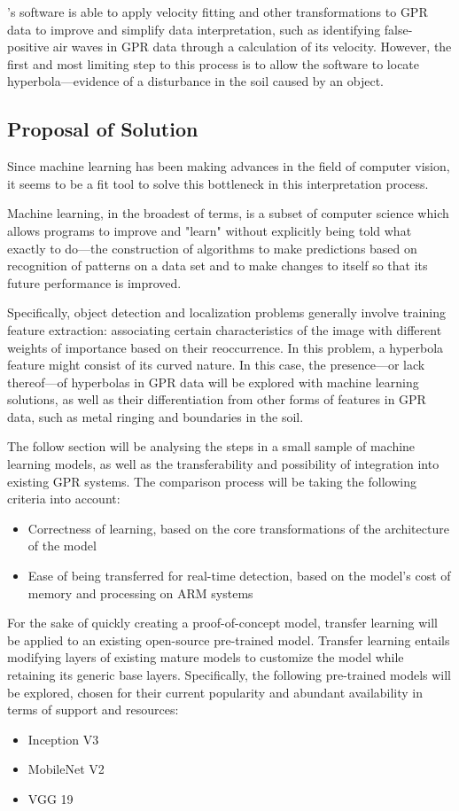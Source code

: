 \documentclass[se,blockletter]{uw-wkrpt}
\begin{document}
\thecompany{}'s software is able to apply velocity fitting and other transformations to GPR data to improve and simplify data interpretation, such as identifying false-positive air waves in GPR data through a calculation of its velocity. However, the first and most limiting step to this process is to allow the software to locate hyperbola---evidence of a disturbance in the soil caused by an object. 

\subsection{Proposal of Solution}
Since machine learning has been making advances in the field of computer vision, it seems to be a fit tool to solve this bottleneck in this interpretation process.

Machine learning, in the broadest of terms, is a subset of computer science which allows programs to improve and "learn" without explicitly being told what exactly to do---the construction of algorithms to make predictions based on recognition of patterns on a data set and to make changes to itself so that its future performance is improved. 

Specifically, object detection and localization problems generally involve training feature extraction: associating certain characteristics of the image with different weights of importance based on their reoccurrence. In this problem, a hyperbola feature might consist of its curved nature. In this case, the presence---or lack thereof---of hyperbolas in GPR data will be explored with machine learning solutions, as well as their differentiation from other forms of features in GPR data, such as metal ringing and boundaries in the soil.

The follow section will be analysing the steps in a small sample of machine learning models, as well as the transferability and possibility of integration into existing GPR systems. The comparison process will be taking the following criteria into account:
\begin{itemize}
\item Correctness of learning, based on the core transformations of the architecture of the model
\item Ease of being transferred for real-time detection, based on the model's cost of memory and processing on ARM systems
\end{itemize} 

For the sake of quickly creating a proof-of-concept model, transfer learning will be applied to an existing open-source pre-trained model. Transfer learning entails modifying layers of existing mature models to customize the model while retaining its generic base layers. Specifically, the following pre-trained models will be explored, chosen for their current popularity and abundant availability in terms of support and resources: 
\begin{itemize}
\item Inception V3
\item MobileNet V2
\item VGG 19
\end{itemize}
\end{document}
